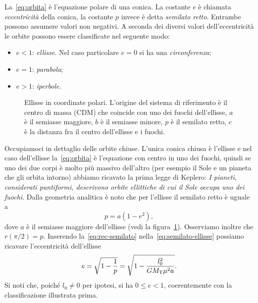 La~\eqref{eq:orbita} è l'equazione polare di una conica. La costante $e$ è
chiamata \emph{eccentricità} della conica, la costante $p$ invece è detta
\emph{semilato retto}. Entrambe possono assumere valori non negativi. A seconda
dei diversi valori dell'eccentricità le orbite possono essere classificate nel
seguente modo:
\begin{itemize}
\item $e<1$: \emph{ellisse}. Nel caso particolare $e=0$ si ha una
  \emph{circonferenza};
\item $e=1$: \emph{parabola};
\item $e>1$: \emph{iperbole}.
\end{itemize}
\begin{figure}
  \centering
  
  \caption{Ellisse in coordinate polari. L'origine del sistema di riferimento è
    il centro di massa (CDM) che coincide con uno dei fuochi dell'ellisse, $a$ è
    il semiasse maggiore, $b$ è il semiasse minore, $p$ è il semilato retto, $c$
    è la distanza fra il centro dell'ellisse e i fuochi.}
  \label{fig:ellisse}
\end{figure}
Occupiamoci in dettaglio delle orbite chiuse. L'unica conica chiusa è l'ellisse
e nel caso dell'ellisse la~\eqref{eq:orbita} è l'equazione con centro in uno dei
fuochi, quindi se uno dei due corpi è molto più massivo dell'altro (per esempio
il Sole e un pianeta che gli orbita intorno) abbiamo ricavato la prima legge di
Keplero: \emph{I pianeti, considerati puntiformi, descrivono orbite ellittiche
  di cui il Sole occupa uno dei fuochi}. Dalla geometria analitica è noto che
per l'ellisse il semilato retto è uguale a
\begin{equation}
  \label{eq:semilato-ellisse}
  p = a(1-e^2),
\end{equation}
dove $a$ è il semiasse maggiore dell'ellisse (vedi la
figura~\ref{fig:ellisse}). Osserviamo inoltre che $r(\pi/2)=p$. Inserendo
la~\eqref{eq:rec-semilato} nella~\eqref{eq:semilato-ellisse} possiamo ricavare
l'eccentricità dell'ellisse
\begin{equation}
  \label{eq:eccentricita-ellisse}
  e = \sqrt{1-\frac{1}{p}} = \sqrt{1-\frac{l_0^2}{GM_\textup{T}\mu^2a}}.
\end{equation}
Si noti che, poiché $l_0\neq 0$ per ipotesi, si ha $0\leq e<1$, coerentemente
con la classificazione illustrata prima.

